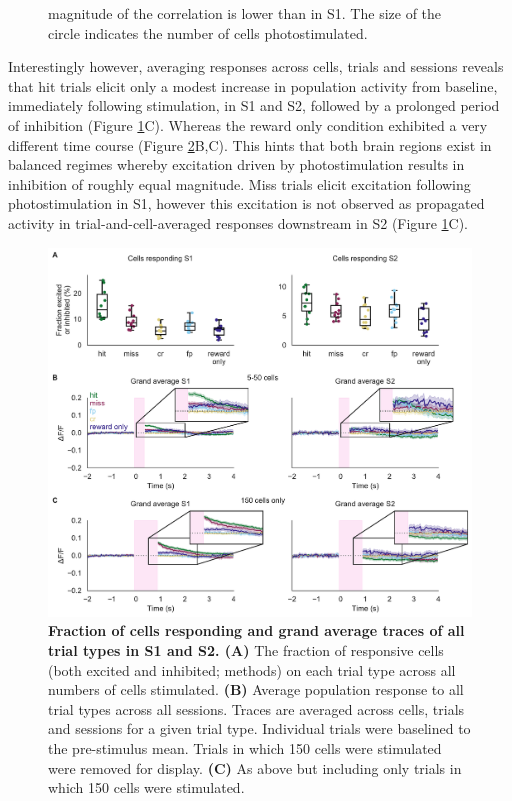 \begin{figure}[htbp]
{magnitude of the correlation is lower than in S1. The size of the circle indicates the number of cells photostimulated. 
} 
\label{fig:basic-analysis}
\end{figure}

Interestingly however, averaging responses across cells, trials and sessions reveals that hit trials elicit only a modest increase in population activity from baseline, immediately following stimulation, in S1 and S2, followed by a prolonged period of inhibition (Figure \ref{fig:basic-analysis}C). Whereas the reward only condition exhibited a very different time course (Figure \ref{fig:supp1}B,C). This hints that both brain regions exist in balanced regimes whereby excitation driven by photostimulation results in inhibition of roughly equal magnitude. Miss trials elicit excitation following photostimulation in S1, however this excitation is not observed as propagated activity in trial-and-cell-averaged responses downstream in S2 (Figure \ref{fig:basic-analysis}C). 


\begin{figure}[h]
\hspace*{-0.25in}
\includegraphics[scale=0.65]{figures/supplements/Supplementary_Figure1.pdf}
\caption[\textbf{Fraction of cells responding and grand average traces of all trial types in S1 and S2}]{\textbf{ Fraction of cells responding and grand average traces of all trial types in S1 and S2.
 (A)} The fraction of responsive cells (both excited and inhibited; methods) on each trial type across all numbers of cells stimulated. \textbf{(B)} Average population response to all trial types across all sessions. Traces are averaged across cells, trials and sessions for a given trial type. Individual trials were baselined to the pre-stimulus mean. Trials in which 150 cells were stimulated were removed for display. \textbf{(C)} As above but including only trials in which 150 cells were stimulated. 
} 
\label{fig:supp1}
\end{figure}


